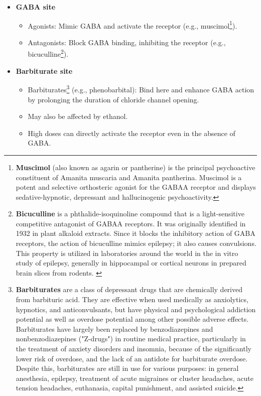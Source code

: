 \documentclass{book}
\begin{document}
\begin{itemize}
    \item \textbf{GABA site}
    \begin{itemize}
        \item Agonists: Mimic GABA and activate the receptor (e.g., muscimol\footnote{\textbf{Muscimol} (also known as agarin or pantherine) is the principal psychoactive constituent of Amanita muscaria and Amanita pantherina. Muscimol is a potent and selective orthosteric agonist for the GABAA receptor and displays sedative-hypnotic, depressant and hallucinogenic psychoactivity.}).
        \item Antagonists: Block GABA binding, inhibiting the receptor (e.g., bicuculline\footnote{\textbf{Bicuculline} is a phthalide-isoquinoline compound that is a light-sensitive competitive antagonist of GABAA receptors. It was originally identified in 1932 in plant alkaloid extracts. Since it blocks the inhibitory action of GABA receptors, the action of bicuculline mimics epilepsy; it also causes convulsions. This property is utilized in laboratories around the world in the in vitro study of epilepsy, generally in hippocampal or cortical neurons in prepared brain slices from rodents. \cite{bicuculline}}).
    \end{itemize}

    \item \textbf{Barbiturate site}
    \begin{itemize}
        \item Barbiturates\footnote{\textbf{Barbiturates} are a class of depressant drugs that are chemically derived from barbituric acid. They are effective when used medically as anxiolytics, hypnotics, and anticonvulsants, but have physical and psychological addiction potential as well as overdose potential among other possible adverse effects. Barbiturates have largely been replaced by benzodiazepines and nonbenzodiazepines ("Z-drugs") in routine medical practice, particularly in the treatment of anxiety disorders and insomnia, because of the significantly lower risk of overdose, and the lack of an antidote for barbiturate overdose. Despite this, barbiturates are still in use for various purposes: in general anesthesia, epilepsy, treatment of acute migraines or cluster headaches, acute tension headaches, euthanasia, capital punishment, and assisted suicide.} (e.g., phenobarbital): Bind here and enhance GABA action by prolonging the duration of chloride channel opening.
        \item May also be affected by ethanol.
        \item High doses can directly activate the receptor even in the absence of GABA.
    \end{itemize}


\end{itemize}
\end{document}
